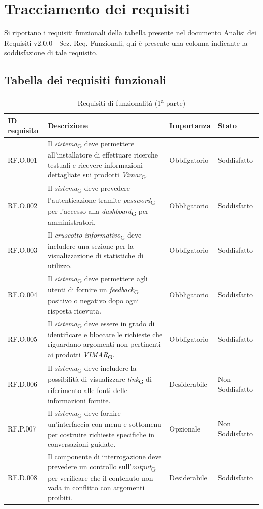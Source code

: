 \section{Tracciamento dei requisiti}
 Si riportano i requisiti funzionali della tabella
presente nel documento Analisi dei Requisiti v2.0.0 - Sez. Req. Funzionali, qui è presente una
colonna indicante la soddisfazione di tale requisito.

\subsection{Tabella dei requisiti funzionali}
\begin{table}[H]
\centering
    \begin{tabular}{|C{2.7cm}|L{6.5cm}|C{2.7cm}|C{2.7cm}|}
        \hline
        \textbf{ID requisito} & \textbf{Descrizione} & \textbf{Importanza} & \textbf{Stato}  \\
        \hline
        RF.O.001 & Il \textit{sistema}\textsubscript{G} deve permettere all'installatore di effettuare ricerche testuali e ricevere informazioni dettagliate sui prodotti \textit{Vimar}\textsubscript{G}. & Obbligatorio & Soddisfatto \\
        \hline
        RF.O.002 & Il \textit{sistema}\textsubscript{G} deve prevedere l'autenticazione tramite \textit{password}\textsubscript{G} per l'accesso alla \textit{dashboard}\textsubscript{G} per amministratori. & Obbligatorio & Soddisfatto \\
        \hline
        RF.O.003 & Il \textit{cruscotto informativo}\textsubscript{G} deve includere una sezione per la visualizzazione di statistiche di utilizzo. & Obbligatorio & Soddisfatto \\
        \hline
        RF.O.004 & Il \textit{sistema}\textsubscript{G} deve permettere agli utenti di fornire un \textit{feedback}\textsubscript{G} positivo o negativo dopo ogni risposta ricevuta. & Obbligatorio & Soddisfatto \\
        \hline
        RF.O.005 & Il \textit{sistema}\textsubscript{G} deve essere in grado di identificare e bloccare le richieste che riguardano argomenti non pertinenti ai prodotti \textit{VIMAR}\textsubscript{G}. & Obbligatorio & Soddisfatto \\
        \hline
        RF.D.006 & Il \textit{sistema}\textsubscript{G} deve includere la possibilità di visualizzare \textit{link}\textsubscript{G} di riferimento alle fonti delle informazioni fornite. & Desiderabile & Non Soddisfatto \\
        \hline
        RF.P.007 & Il \textit{sistema}\textsubscript{G} deve fornire un'interfaccia con menu e sottomenu per costruire richieste specifiche in conversazioni guidate. & Opzionale & Non Soddisfatto\\
        \hline
        RF.D.008 & Il componente di interrogazione deve prevedere un controllo sull’\textit{output}\textsubscript{G}
        per verificare che il contenuto non vada in conflitto con argomenti proibiti. & Desiderabile &  Soddisfatto \\
        \hline
        \end{tabular}
    \caption{Requisiti di funzionalità (1\textsuperscript{a}  parte)}
\end{table}
